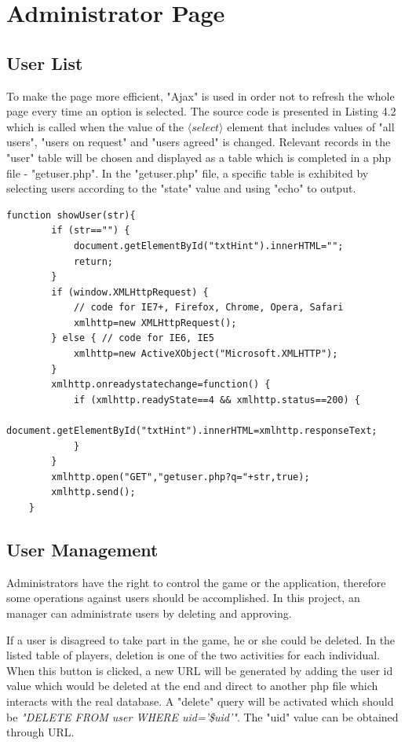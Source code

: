 \section{Administrator Page}
\subsection{User List}
To make the page more efficient, "Ajax" is used in order not to refresh the whole page every time an option is selected. The source code is presented in Listing 4.2 which is called when the value of the $\langle select \rangle$ element that includes values of "all users", "users on request" and "users agreed" is changed. Relevant records in the "user" table will be chosen and displayed as a table which is completed in a php file - "getuser.php". In the "getuser.php" file, a specific table is exhibited by selecting users according to the "state" value and using "echo" to output.

\begin{lstlisting}[caption=Ajax segment for listing users]
function showUser(str){
		if (str=="") {
    		document.getElementById("txtHint").innerHTML="";
  		  	return;
  		} 
  		if (window.XMLHttpRequest) {
    		// code for IE7+, Firefox, Chrome, Opera, Safari
    		xmlhttp=new XMLHttpRequest();
  		} else { // code for IE6, IE5
    		xmlhttp=new ActiveXObject("Microsoft.XMLHTTP");
  		}
  		xmlhttp.onreadystatechange=function() {
    		if (xmlhttp.readyState==4 && xmlhttp.status==200) {
      			document.getElementById("txtHint").innerHTML=xmlhttp.responseText;
    		}
  		}
  		xmlhttp.open("GET","getuser.php?q="+str,true);
  		xmlhttp.send();
	}

\end{lstlisting}

\subsection{User Management}
Administrators have the right to control the game or the application, therefore some operations against users should be accomplished. In this project, an manager can administrate users by deleting and approving.

If a user is disagreed to take part in the game, he or she could be deleted. In the listed table of players, deletion is one of the two activities for each individual. When this button is clicked, a new URL will be generated by adding the user id value which would be deleted at the end and direct to another php file which interacts with the real database. A "delete" query will be activated which should be \textit{"DELETE FROM user WHERE uid='\$uid'"}. The "uid" value can be obtained through URL.

